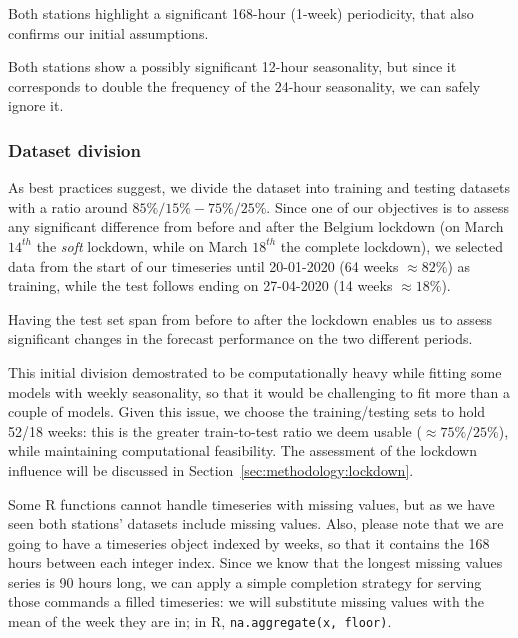 \documentclass[12pt]{article}
\begin{document}
Both stations highlight a significant 168-hour (1-week) periodicity, that also confirms our initial assumptions.

Both stations show a possibly significant 12-hour seasonality, but since it corresponds to double the frequency of the 24-hour seasonality, we can safely ignore it.

\subsubsection{Dataset division}
As best practices suggest, we divide the dataset into training and testing datasets with a ratio around $85\%/15\% - 75\%/25\%$.
Since one of our objectives is to assess any significant difference from before and after the Belgium lockdown (on March $14^{th}$ the \textit{soft} lockdown, while on March $18^{th}$ the complete lockdown), we selected data from the start of our timeseries until 20-01-2020 (64 weeks $\approx 82\%$) as training, while the test follows ending on 27-04-2020 (14 weeks $\approx 18\%$).

Having the test set span from before to after the lockdown enables us to assess significant changes in the forecast performance on the two different periods.

This initial division demostrated to be computationally heavy while fitting some models with weekly seasonality, so that it would be challenging to fit more than a couple of models.
Given this issue, we choose the training/testing sets to hold 52/18 weeks: this is the greater train-to-test ratio we deem usable ($\approx 75\%/25\%$), while maintaining computational feasibility.
The assessment of the lockdown influence will be discussed in Section~\ref{sec:methodology:lockdown}.

Some R functions cannot handle timeseries with missing values, but as we have seen both stations' datasets include missing values.
Also, please note that we are going to have a timeseries object indexed by weeks, so that it contains the 168 hours between each integer index.
Since we know that the longest missing values series is 90 hours long, we can apply a simple completion strategy for serving those commands a filled timeseries: we will substitute missing values with the mean of the week they are in; in R, \texttt{na.aggregate(x, floor)}.
\end{document}

